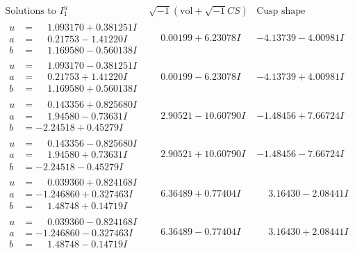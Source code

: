\documentclass[1p]{elsarticle_modified}
\theoremstyle{definition}
\newcommand{\I}{\sqrt{-1}}
\begin{document}
$$\begin{array}{c|c|c}  
\text{Solutions to }I^u_{1}& \I (\text{vol} + \sqrt{-1}CS) & \text{Cusp shape}\\
 \hline 
\begin{aligned}
u &= \phantom{-}1.093170 + 0.381251 I \\
a &= \phantom{-}0.21753 - 1.41220 I \\
b &= \phantom{-}1.169580 - 0.560138 I\end{aligned}
 & \phantom{-}0.00199 + 6.23078 I & -4.13739 - 4.00981 I \\ \hline\begin{aligned}
u &= \phantom{-}1.093170 - 0.381251 I \\
a &= \phantom{-}0.21753 + 1.41220 I \\
b &= \phantom{-}1.169580 + 0.560138 I\end{aligned}
 & \phantom{-}0.00199 - 6.23078 I & -4.13739 + 4.00981 I \\ \hline\begin{aligned}
u &= \phantom{-}0.143356 + 0.825680 I \\
a &= \phantom{-}1.94580 - 0.73631 I \\
b &= -2.24518 + 0.45279 I\end{aligned}
 & \phantom{-}2.90521 - 10.60790 I & -1.48456 + 7.66724 I \\ \hline\begin{aligned}
u &= \phantom{-}0.143356 - 0.825680 I \\
a &= \phantom{-}1.94580 + 0.73631 I \\
b &= -2.24518 - 0.45279 I\end{aligned}
 & \phantom{-}2.90521 + 10.60790 I & -1.48456 - 7.66724 I \\ \hline\begin{aligned}
u &= \phantom{-}0.039360 + 0.824168 I \\
a &= -1.246860 + 0.327463 I \\
b &= \phantom{-}1.48748 + 0.14719 I\end{aligned}
 & \phantom{-}6.36489 + 0.77404 I & \phantom{-}3.16430 - 2.08441 I \\ \hline\begin{aligned}
u &= \phantom{-}0.039360 - 0.824168 I \\
a &= -1.246860 - 0.327463 I \\
b &= \phantom{-}1.48748 - 0.14719 I\end{aligned}
 & \phantom{-}6.36489 - 0.77404 I & \phantom{-}3.16430 + 2.08441 I \\ \hline\begin{aligned}

\end{aligned}
\end{array}$$
\end{document}
